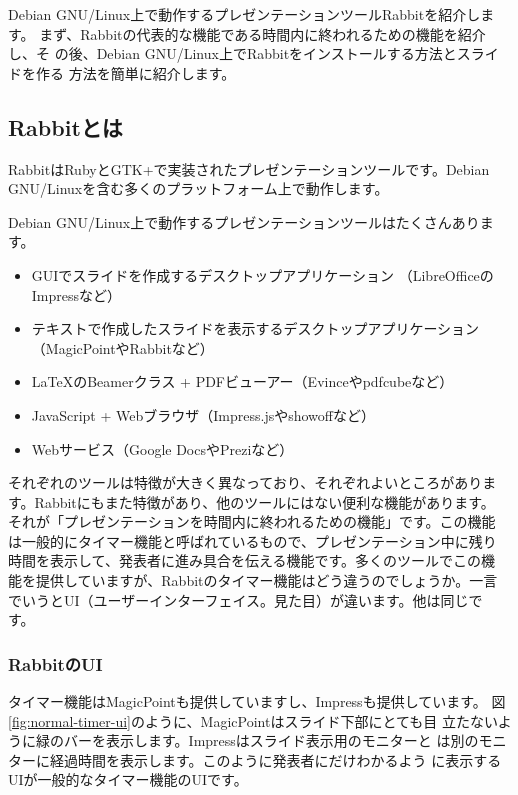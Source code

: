 \documentclass[mingoth,a4paper]{jsarticle}
\begin{document}
\vspace{2em}

Debian GNU/Linux上で動作するプレゼンテーションツールRabbitを紹介します。
まず、Rabbitの代表的な機能である時間内に終われるための機能を紹介し、そ
の後、Debian GNU/Linux上でRabbitをインストールする方法とスライドを作る
方法を簡単に紹介します。

\subsection{Rabbitとは}

RabbitはRubyとGTK+で実装されたプレゼンテーションツールです。Debian
GNU/Linuxを含む多くのプラットフォーム上で動作します。

Debian GNU/Linux上で動作するプレゼンテーションツールはたくさんあります。

\begin{itemize}
\item GUIでスライドを作成するデスクトップアプリケーション
  （LibreOfficeのImpressなど）
\item テキストで作成したスライドを表示するデスクトップアプリケーション
  （MagicPointやRabbitなど）
\item \LaTeX{}のBeamerクラス + PDFビューアー（Evinceやpdfcubeなど）
\item JavaScript + Webブラウザ（Impress.jsやshowoffなど）
\item Webサービス（Google DocsやPreziなど）
\end{itemize}

それぞれのツールは特徴が大きく異なっており、それぞれよいところがありま
す。Rabbitにもまた特徴があり、他のツールにはない便利な機能があります。
それが「プレゼンテーションを時間内に終われるための機能」です。この機能
は一般的にタイマー機能と呼ばれているもので、プレゼンテーション中に残り
時間を表示して、発表者に進み具合を伝える機能です。多くのツールでこの機
能を提供していますが、Rabbitのタイマー機能はどう違うのでしょうか。一言
でいうとUI（ユーザーインターフェイス。見た目）が違います。他は同じで
す。

\subsubsection{RabbitのUI}

タイマー機能はMagicPointも提供していますし、Impressも提供しています。
図\ref{fig:normal-timer-ui}のように、MagicPointはスライド下部にとても目
立たないように緑のバーを表示します。Impressはスライド表示用のモニターと
は別のモニターに経過時間を表示します。このように発表者にだけわかるよう
に表示するUIが一般的なタイマー機能のUIです。
\end{document}
